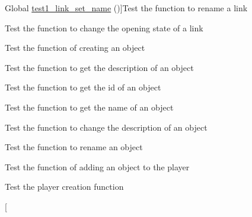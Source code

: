 \begin{DoxyRefList}
%
Global \hyperlink{link__test_8c_ae0e478a0540bed26befc071591e3ff6c}{test1\+\_\+link\+\_\+set\+\_\+name} ()]Test the function to rename a link  
\item[\label{test__test000089}%
\Hypertarget{test__test000089}%
Global \hyperlink{link__test_8c_acbe99eb2aa596b7466ba69d1b78c3f3b}{test1\+\_\+link\+\_\+set\+\_\+open} ()]Test the function to change the opening state of a link  
\item[\label{test__test000103}%
\Hypertarget{test__test000103}%
Global \hyperlink{object__test_8c_a3836d69f92ce7149d56bafcaec83f516}{test1\+\_\+object\+\_\+create} ()]Test the function of creating an object  
\item[\label{test__test000109}%
\Hypertarget{test__test000109}%
Global \hyperlink{object__test_8c_afe180b78a201df7bc1629701db1d464c}{test1\+\_\+object\+\_\+get\+\_\+description} ()]Test the function to get the description of an object  
\item[\label{test__test000111}%
\Hypertarget{test__test000111}%
Global \hyperlink{object__test_8c_aa88e9e9dab92ba9c58851d7a7a8415f0}{test1\+\_\+object\+\_\+get\+\_\+id} ()]Test the function to get the id of an object  
\item[\label{test__test000113}%
\Hypertarget{test__test000113}%
Global \hyperlink{object__test_8c_ad2411bc3cc47c9905e63a3d9c561d369}{test1\+\_\+object\+\_\+get\+\_\+name} ()]Test the function to get the name of an object  
\item[\label{test__test000107}%
\Hypertarget{test__test000107}%
Global \hyperlink{object__test_8c_afb26b8c66d332354df8bfd57a8033b8f}{test1\+\_\+object\+\_\+set\+\_\+description} ()]Test the function to change the description of an object  
\item[\label{test__test000105}%
\Hypertarget{test__test000105}%
Global \hyperlink{object__test_8c_a74e25ad653c4a32b9922fff8e4f916fd}{test1\+\_\+object\+\_\+set\+\_\+name} ()]Test the function to rename an object  
\item[\label{test__test000117}%
\Hypertarget{test__test000117}%
Global \hyperlink{player__test_8c_a14a3e4867e2ad3287c8efa99cd36904e}{test1\+\_\+player\+\_\+add\+\_\+object} ()]Test the function of adding an object to the player  
\item[\label{test__test000115}%
\Hypertarget{test__test000115}%
Global \hyperlink{player__test_8c_ab29768452373e16bb6aaa1f7998f62fb}{test1\+\_\+player\+\_\+create} ()]Test the player creation function  
\item[\label{test__test000120}%

\end{DoxyRefList}
